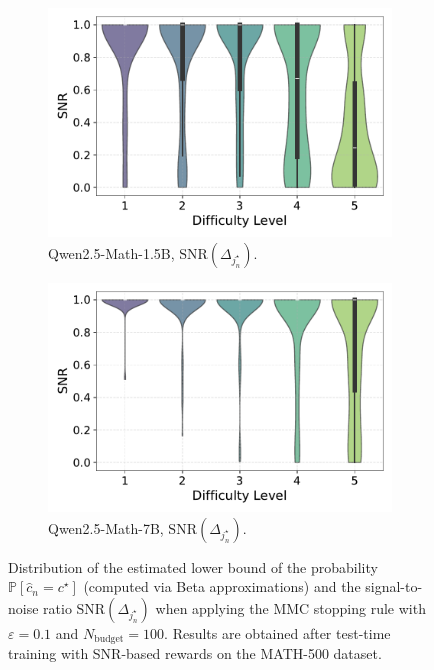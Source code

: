 \begin{figure}[h!]
\begin{subfigure}{0.49\textwidth}
      \centering
      \includegraphics[width=\textwidth]{figs/QWEN-MATH-1.5B_violin_maj100_SNR_01.pdf}
      \caption{Qwen2.5-Math-1.5B, ${\text{SNR}}(\Delta_{j^\star_n})$.}
      \label{fig:QWEN-MATH-1.5B-SNR-0.1}
  \end{subfigure}
  \hfill
  \begin{subfigure}{0.49\textwidth}
      \centering
      \includegraphics[width=\textwidth]
      {figs/QWEN-MATH-7B_violin_maj100_SNR_01.pdf}      
        \caption{Qwen2.5-Math-7B, ${\text{SNR}}(\Delta_{j^\star_n})$.}
      \label{fig:QWEN-MATH-7B-SNR-0.1}
  \end{subfigure}
  \caption{Distribution of the estimated lower bound of the probability $\mathbb{P}[\widehat{c}_n = c^\star]$ (computed via Beta approximations) and the signal-to-noise ratio $\text{SNR}(\Delta_{j^\star_n})$ when applying the MMC stopping rule with $\varepsilon = 0.1$ and $N_{\text{budget}}=100$. Results are obtained after test-time training with SNR-based rewards on the MATH-500 dataset.}
  \label{fig:violin_plots_main_text}
\end{figure}
